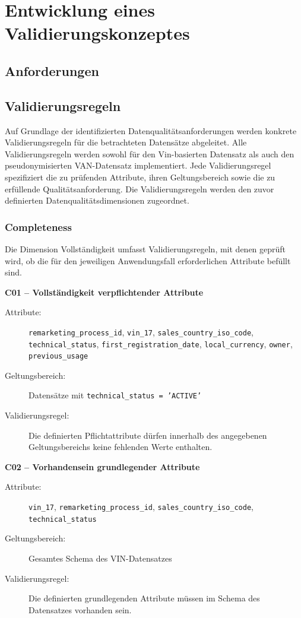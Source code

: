 \documentclass[../main.tex]{subfiles}
\begin{document}
\chapter{Entwicklung eines Validierungskonzeptes}
\label{chap:konzeptentwicklung}

\section{Anforderungen}

\section{Validierungsregeln}

Auf Grundlage der identifizierten Datenqualitätsanforderungen werden konkrete Validierungsregeln für die betrachteten Datensätze abgeleitet. Alle Validierungsregeln werden sowohl für den Vin-basierten Datensatz als auch den pseudonymisierten VAN-Datensatz implementiert. Jede Validierungsregel spezifiziert die zu prüfenden Attribute, ihren Geltungsbereich sowie die zu erfüllende Qualitätsanforderung. Die Validierungsregeln werden den zuvor definierten Datenqualitätsdimensionen zugeordnet.

\subsection{Completeness}

Die Dimension Vollständigkeit umfasst Validierungsregeln, mit denen geprüft wird, ob die für den jeweiligen Anwendungsfall erforderlichen Attribute befüllt sind.

\medskip
\noindent\textbf{C01 -- Vollständigkeit verpflichtender Attribute}
\begin{description} 
    \item[Attribute:] \texttt{remarketing\_process\_id}, \texttt{vin\_17}, \texttt{sales\_country\_iso\_code}, \texttt{technical\_status}, \texttt{first\_registration\_date}, \texttt{local\_currency}, \texttt{owner}, \texttt{previous\_usage} 
    \item[Geltungsbereich:] Datensätze mit \texttt{technical\_status = 'ACTIVE'} 
    \item[Validierungsregel:] Die definierten Pflichtattribute dürfen innerhalb des angegebenen Geltungsbereichs keine fehlenden Werte enthalten. 
\end{description} 
    
\medskip 
\noindent\textbf{C02 -- Vorhandensein grundlegender Attribute} 
\begin{description} 
    \item[Attribute:] \texttt{vin\_17}, \texttt{remarketing\_process\_id}, \texttt{sales\_country\_iso\_code}, \texttt{technical\_status} 
    \item[Geltungsbereich:] Gesamtes Schema des VIN-Datensatzes 
    \item[Validierungsregel:] Die definierten grundlegenden Attribute müssen im Schema des Datensatzes vorhanden sein. 
\end{description} 
\end{document}
